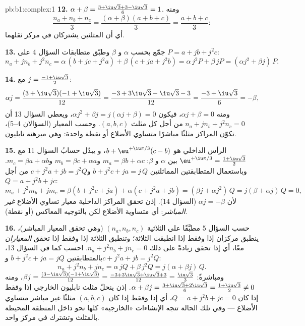 \begin{solution}{pb:b1:complex:1}
\textbf{12.} $\alpha + \beta = \frac{3 + \iu\sqrt3 + 3 -
\iu\sqrt3}6 = 1$. ومنه
\[
\frac{n_a + n_b + n_c}3
= \frac{(\alpha + \beta)(a + b + c)}3 = \frac{a + b + c}3 :
\]
أي أن المثلثين يشتركان في مركز ثقلهما.

\textbf{13.} جمّع بحسب $\alpha$ و $\beta$ وطبّق متطابقات السؤال 4
على $P = a + jb + j^2c$:
\[
n_a + j n_b + j^2 n_c
= \alpha\,(b + jc + j^2 a) + \beta\,(c + ja + j^2 b)
= \alpha\,j^2 P + \beta\,j P
= (\alpha j^2 + \beta j)\,P .
\]

\textbf{14.} مع $j = \frac{-1 + \iu\sqrt3}2$:
\[
\alpha j = \frac{(3 + \iu\sqrt3)(-1 + \iu\sqrt3)}{12}
= \frac{-3 + 3\iu\sqrt3 - \iu\sqrt3 - 3}{12}
= \frac{-3 + \iu\sqrt3}6 = -\beta ,
\]
ومنه $\alpha j + \beta = 0$، فيكون $\alpha j^2 + \beta j = j(\alpha j
+ \beta) = 0$، ويعطي السؤال 13 أن $n_a + jn_b + j^2n_c = 0$ من أجل
كل مثلث $(a, b, c)$. وحسب المعيار (السؤالان 4--5)، تكوّن
المراكز مثلثًا مباشرًا متساوي الأضلاع أو نقطة واحدة:
وهي مبرهنة نابليون.

\textbf{15.} الرأس الداخلي هو $b + \eu^{+\iu\pi/3}(c - b)$، و
يبدّل حسابُ السؤال 11 مع $\eu^{+\iu\pi/3} = \frac{1 +
\iu\sqrt3}2$ بين $\alpha$ و $\beta$: $m_a = \beta b + \alpha
c$ و$m_b = \beta c + \alpha a$ و$m_c = \beta a + \alpha b$. وباستعمال
المتطابقتين المماثلتين $b + j^2c + ja = j\,Q$ و$c + j^2a + jb
= j^2 Q$ من أجل $Q = a + j^2b + jc$:
\[
m_a + j^2 m_b + j m_c
= \beta(b + j^2 c + ja) + \alpha(c + j^2 a + jb)
= (\beta j + \alpha j^2)\, Q = j(\beta + \alpha j)\,Q = 0 ,
\]
لأن $\alpha j = -\beta$ (السؤال 14). إذن تحقق المراكز الداخلية
معيار تساوي الأضلاع \emph{غير المباشر}: أي متساوية الأضلاع لكن
بالتوجيه المعاكس (أو نقطة).

\textbf{16.} حسب السؤال 5 مطبَّقًا على الثلاثية $(n_a, n_b, n_c)$
(وهي تحقق المعيار المباشر)، ينطبق مركزان إذا وفقط إذا
انطبقت الثلاثة؛ وتنطبق الثلاثة إذا وفقط إذا تحقق \emph{المعياران} معًا،
أي إذا تحقق زيادةً على ذلك $n_a + j^2 n_b + j n_c = 0$. احسب كما في
السؤال 13، بالمتطابقتين $b + j^2c + ja = jQ$ و$c + j^2a +
jb = j^2Q$:
\[
n_a + j^2 n_b + j n_c
= \alpha\,jQ + \beta\,j^2 Q = j(\alpha + \beta j)\,Q .
\]
ومباشرةً: $\beta j = \frac{(3 -
\iu\sqrt3)(-1 + \iu\sqrt3)}{12} = \frac{-3 + 3\iu\sqrt3 +
\iu\sqrt3 + 3}{12} = \frac{\iu\sqrt3}3$، ومنه $\alpha + \beta j =
\frac{3 + \iu\sqrt3 + 2\iu\sqrt3}6 = \frac{1 + \iu\sqrt3}2 \neq
0$. إذن ينحلّ مثلث نابليون الخارجي إذا وفقط إذا كان $Q = a +
j^2b + jc = 0$، أي إذا وفقط إذا كان $(a, b, c)$ مثلثًا غير مباشر
متساوي الأضلاع --- وفي تلك الحالة تتجه الإنشاءات «الخارجية» كلها
نحو داخل المنطقة المحيطة بالمثلث وتشترك في مركز واحد.


\end{solution}
